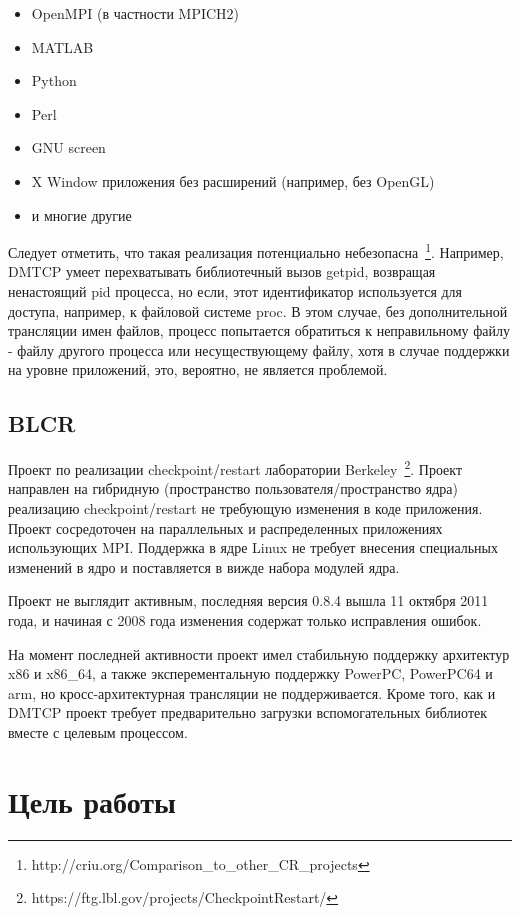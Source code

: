 \begin{itemize}

    \item OpenMPI (в частности MPICH2)
    \item MATLAB
    \item Python
    \item Perl
    \item GNU screen
    \item X Window приложения без расширений (например, без OpenGL)
    \item и многие другие

\end{itemize}

Следует отметить, что такая реализация потенциально небезопасна~\footnote{http://criu.org/Comparison\_to\_other\_CR\_projects}. Например, DMTCP умеет перехватывать библиотечный вызов getpid, возвращая ненастоящий pid процесса, но если, этот идентификатор используется для доступа, например, к файловой системе proc. В этом случае, без дополнительной трансляции имен файлов, процесс попытается обратиться к неправильному файлу - файлу другого процесса или несуществующему файлу, хотя в случае поддержки на уровне приложений, это, вероятно, не является проблемой.

\subsection{BLCR}

Проект по реализации checkpoint/restart лаборатории Berkeley~\footnote{https://ftg.lbl.gov/projects/CheckpointRestart/}. Проект направлен на гибридную (пространство пользователя/пространство ядра) реализацию checkpoint/restart не требующую изменения в коде приложения. Проект сосредоточен на параллельных и распределенных приложениях использующих MPI. Поддержка в ядре Linux не требует внесения специальных изменений в ядро и поставляется в вижде набора модулей ядра.

Проект не выглядит активным, последняя версия 0.8.4 вышла 11 октября 2011 года, и начиная с 2008 года изменения содержат только исправления ошибок.

На момент последней активности проект имел стабильную поддержку архитектур x86 и x86\_64, а также эксперементальную поддержку PowerPC, PowerPC64 и arm, но кросс-архитектурная трансляции не поддерживается. Кроме того, как и DMTCP проект требует предварительно загрузки вспомогательных библиотек вместе с целевым процессом.

\section{Цель работы}

